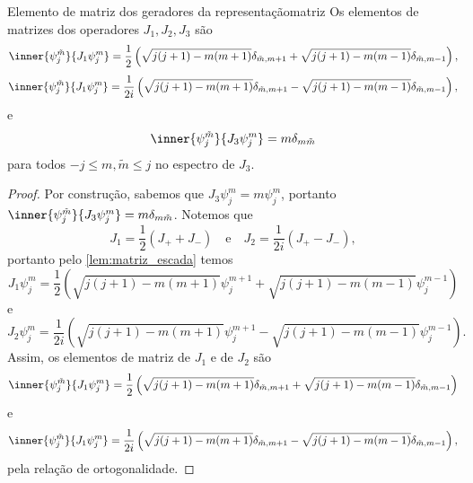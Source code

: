 \begin{proposition}{Elemento de matriz dos geradores da representação}{matriz}
    Os elementos de matrizes dos operadores \(J_1, J_2, J_3\) são
    \begin{equation*}
        \inner{\psi_j^{\tilde{m}}}{J_1\psi_j^m} = \frac12\left(\sqrt{j(j+1) - m(m+1)} \delta_{\tilde{m},m+1} + \sqrt{j(j+1) - m(m-1)}\delta_{\tilde{m}, m-1}\right),
    \end{equation*}
    \begin{equation*}
        \inner{\psi_j^{\tilde{m}}}{J_1\psi_j^m} = \frac1{2i}\left(\sqrt{j(j+1) - m(m+1)} \delta_{\tilde{m},m+1} - \sqrt{j(j+1) - m(m-1)}\delta_{\tilde{m}, m-1}\right),
    \end{equation*}
    e
    \begin{equation*}
        \inner{\psi_{j}^{\tilde{m}}}{J_3 \psi_{j}^m} = m \delta_{m \tilde{m}}
    \end{equation*}
    para todos \(-j \leq m, \tilde{m} \leq j\) no espectro de \(J_3\).
\end{proposition}
\begin{proof}
    Por construção, sabemos que \(J_3 \psi_j^m = m \psi_j^m\), portanto \(\inner{\psi_j^{\tilde{m}}}{J_3 \psi_j^m} = m \delta_{m \tilde{m}}\). Notemos que
    \begin{equation*}
        J_1 = \frac12\left(J_+ + J_-\right)\quad\text{e}\quad J_2 = \frac1{2i}\left(J_+ - J_-\right),
    \end{equation*}
    portanto pelo \cref{lem:matriz_escada} temos
    \begin{equation*}
        J_1\psi_j^m = \frac12\left(\sqrt{j(j+1) - m(m+1)}\psi_j^{m+1} + \sqrt{j(j+1) - m(m-1)}\psi_j^{m-1}\right)
    \end{equation*}
    e
    \begin{equation*}
        J_2\psi_j^m = \frac1{2i}\left(\sqrt{j(j+1) - m(m+1)}\psi_j^{m+1} - \sqrt{j(j+1) - m(m-1)}\psi_j^{m-1}\right).
    \end{equation*}
    Assim, os elementos de matriz de \(J_1\) e de \(J_2\) são
    \begin{equation*}
        \inner{\psi_j^{\tilde{m}}}{J_1\psi_j^m} = \frac12\left(\sqrt{j(j+1) - m(m+1)} \delta_{\tilde{m},m+1} + \sqrt{j(j+1) - m(m-1)}\delta_{\tilde{m}, m-1}\right)
    \end{equation*}
    e
    \begin{equation*}
        \inner{\psi_j^{\tilde{m}}}{J_1\psi_j^m} = \frac1{2i}\left(\sqrt{j(j+1) - m(m+1)} \delta_{\tilde{m},m+1} - \sqrt{j(j+1) - m(m-1)}\delta_{\tilde{m}, m-1}\right),
    \end{equation*}
    pela relação de ortogonalidade.
\end{proof}
